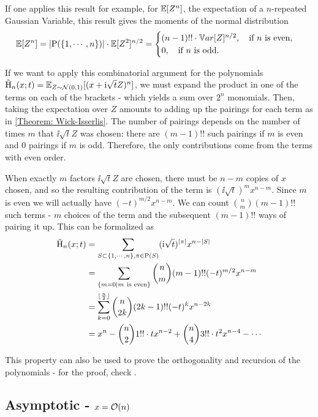 If one applies this result for example, for $\mathbb{E}[Z^n]$, the expectation of a $n$-repeated Gaussian Variable, this result gives the moments of the normal distribution
\begin{equation}
	\mathbb{E}[Z^n] = |\mathrm{P}(\{1,\cdots,n\})| \cdot \mathbb{E}[Z^2]^{n/2} = 
	\begin{cases}
		(n-1)!! \cdot \mathbb{V}ar[Z]^{n/2}, \quad \text{if $n$ is even}, \\
		0, \quad \text{if $n$ is odd}.
	\end{cases}
	\label{Equation: Normal Moments}
\end{equation}

If we want to apply this combinatorial argument for the polynomials $\tilde{\mathrm{H}}_n(x;t) = \mathbb{E}_{Z \sim \mathcal{N}(0,1)}[(x+\mathrm{i} \sqrt{t}Z)^n]$, we must expand the product in one of the terms on each of the brackets - which yields a sum over $2^n$ monomials. Then, taking the expectation over $Z$ amounts to adding up the pairings for each term as in \ref{Theorem: Wick-Isserlis}. The number of pairings depends on the number of times $m$ that $\ii \sqrt{t} Z$ was chosen: there are $(m-1)!!$ such pairings if $m$ is even and $0$ pairings if $m$ is odd. Therefore, the only contributions come from the terms with even order.

When exactly $m$ factors $\ii \sqrt{t} Z$ are chosen, there must be $n-m$ copies of $x$ chosen, and so the resulting contribution of the term is $(\ii \sqrt{t})^m x^{n-m}$. Since $m$ is even we will actually have $(-t)^{m/2} x^{n-m}$. We can count $\binom{n}{m}(m-1)!!$ such terms - $m$ choices of the term and the subsequent $(m-1)!!$ ways of pairing it up. This can be formalized as
\begin{align}
	\tilde{\mathrm{H}}_n(x;t) & = \sum_{S \subset \{1,\cdots,n\}, \pi \in \mathrm{P}(S)} (\mathrm{i} \sqrt{t})^{|\pi|} x^{n-|S|} \\
	& = \sum_{\{m=0 | m \ \text{is even}\}} \binom{n}{m} (m-1)!! (-t)^{m/2} x^{n-m} \\
	& = \sum_{k=0}^{\lfloor\frac{n}{2}\rfloor} \binom{n}{2k} (2k-1)!! (-t)^{k} x^{n-2k} \\
	& = x^n - \binom{n}{2} 1!! \cdot t x^{n-2} + \binom{n}{4} 3!! \cdot t^2 x^{n-4} - \cdots
\end{align} 

This property can also be used to prove the orthogonality and recursion of the polynomials - for the proof, check \cite{nica2025gaussianintegralformulahermite}.

\subsection{Asymptotic - $x = \mathcal{O}(n)$}
\label{Subsection: Hermite x=n}

